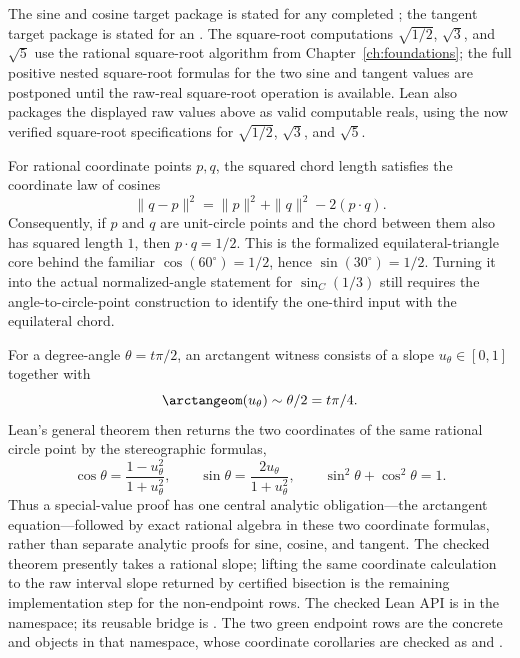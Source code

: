 \begin{definition}
\[\]
The sine and cosine target package is stated for any completed
; the tangent target package is stated for an
.
The square-root computations \(\sqrt{1/2}\), \(\sqrt3\), and \(\sqrt5\) use
the rational square-root algorithm from Chapter~\ref{ch:foundations}; the full
positive nested square-root formulas for the two sine and tangent values are
postponed until the raw-real square-root operation is available.  Lean also packages the
displayed raw values above as valid computable reals, using the now verified
square-root specifications for \(\sqrt{1/2}\), \(\sqrt3\), and \(\sqrt5\).
\end{definition}

\begin{theorem}
\label{thm:law-of-cosines-equilateral}
\leanok
For rational coordinate points \(p,q\), the squared chord length satisfies the
coordinate law of cosines
\[
  \|q-p\|^2=\|p\|^2+\|q\|^2-2(p\cdot q).
\]
Consequently, if \(p\) and \(q\) are unit-circle points and the chord between
them also has squared length \(1\), then \(p\cdot q=1/2\).  This is the
formalized equilateral-triangle core behind the familiar
\(\cos(60^\circ)=1/2\), hence \(\sin(30^\circ)=1/2\).  Turning it into the
actual normalized-angle statement for \(\sin_C(1/3)\) still requires the
angle-to-circle-point construction to identify the one-third input with the
equilateral chord.
\end{theorem}

\begin{theorem}
\label{thm:arctan-witness-coordinates}
\leanok
For a degree-angle \(\theta=t\pi/2\), an arctangent witness consists of a
slope \(u_\theta\in[0,1]\) together with
\[
  \arctangeom(u_\theta)\sim\theta/2=t\pi/4.
\]
Lean's general theorem then returns the two coordinates of the same rational
circle point by the stereographic formulas,
\[
  \cos\theta=\frac{1-u_\theta^2}{1+u_\theta^2},\qquad
  \sin\theta=\frac{2u_\theta}{1+u_\theta^2},
  \qquad \sin^2\theta+\cos^2\theta=1.
\]
Thus a special-value proof has one central analytic obligation---the
arctangent equation---followed by exact rational algebra in these two
coordinate formulas, rather than separate analytic proofs for sine, cosine,
and tangent.  The checked theorem presently takes a rational slope; lifting the
same coordinate calculation to the raw interval slope returned by certified
bisection is the remaining implementation step for the non-endpoint rows.
The checked Lean API is  in the
 namespace; its reusable bridge is
.  The two green endpoint
rows are the concrete  and  objects in that namespace,
whose coordinate corollaries are checked as  and
.
\end{theorem}

